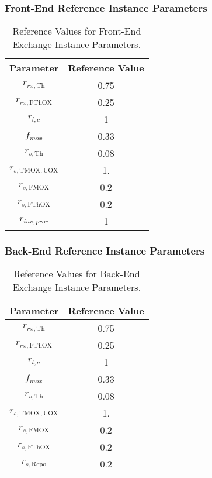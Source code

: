 \subsubsection{Front-End Reference Instance Parameters}


\begin{table}[h!]
\centering
\caption{Reference Values for Front-End Exchange Instance Parameters.}
\label{tbl:front_ref_params}
\begin{tabular}{|c|c|}
\hline
Parameter    & Reference Value
\\ \hline
$r_{rx, \text{Th}}$   & 0.75 
\\ \hline
$r_{rx, \text{FThOX}}$ & 0.25
\\ \hline
$r_{l, c}$ & 1
\\ \hline
$f_{mox}$     & 0.33
\\ \hline
$r_{s, \text{Th}}$ & 0.08
\\ \hline
$r_{s, \text{TMOX}, \text{UOX}}$ & 1.
\\ \hline
$r_{s, \text{FMOX}}$ & 0.2
\\ \hline
$r_{s, \text{FThOX}}$ & 0.2
\\ \hline
$r_{inv, proc}$   & 1
\\ \hline
\end{tabular}
\end{table}


\subsubsection{Back-End Reference Instance Parameters}


\begin{table}[h!]
\centering
\caption{Reference Values for Back-End Exchange Instance Parameters.}
\label{tbl:back_ref_params}
\begin{tabular}{|c|c|}
\hline
Parameter    & Reference Value
\\ \hline
$r_{rx, \text{Th}}$   & 0.75 
\\ \hline
$r_{rx, \text{FThOX}}$ & 0.25
\\ \hline
$r_{l, c}$ & 1
\\ \hline
$f_{mox}$     & 0.33
\\ \hline
$r_{s, \text{Th}}$ & 0.08
\\ \hline
$r_{s, \text{TMOX}, \text{UOX}}$ & 1.
\\ \hline
$r_{s, \text{FMOX}}$ & 0.2
\\ \hline
$r_{s, \text{FThOX}}$ & 0.2
\\ \hline
$r_{s, \text{Repo}}$   & 0.2
\\ \hline
\end{tabular}
\end{table}

